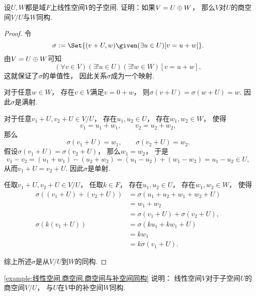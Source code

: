 \begin{example}\label{example:线性空间.商空间.商空间与补空间同构}
设\(U,W\)都是域\(F\)上线性空间\(V\)的子空间.
证明：如果\(V = U \oplus W\)，
那么\(V\)对\(U\)的商空间\(V/U\)与\(W\)同构.
\begin{proof}
令\begin{equation*}
	\sigma \defeq \Set{
		(v+U,w)
		\given
		(\exists u \in U)
		[v=u+w]
	}.
\end{equation*}
由\(V = U \oplus W\)可知\[
	(\forall v \in V)
	(\exists! u \in U)
	(\exists! w\in W)
	[v = u + w],
\]
这就保证了\(\sigma\)的单值性，
因此关系\(\sigma\)成为一个映射.

对于任意\(w \in W\)，
存在\(v \in V\)满足\(v = 0+w\)，
则\(\sigma(v+U) = \sigma(w+U) = w\).
因此\(\sigma\)是满射.

对于任意\(v_1+U,v_2+U \in V/U\)，
存在\(u_1,u_2 \in U\)，
存在\(w_1,w_2 \in W\)，
使得\begin{equation*}
	v_1 = u_1 + w_1,
	\qquad
	v_2 = u_2 + w_2,
\end{equation*}
那么\begin{equation*}
	\sigma(v_1+U) = w_1,
	\qquad
	\sigma(v_2+U) = w_2.
\end{equation*}
假设\(\sigma(v_1+U) = \sigma(v_2+U)\)，
那么\(w_1 = w_2\)，
于是\begin{equation*}
	v_1 - v_2
	= (u_1 + w_1) - (u_2 + w_2)
	= (u_1 - u_2) + (w_1 - w_2)
	= u_1 - u_2
	\in U,
\end{equation*}
从而\(v_1+U = v_2+U\).
因此\(\sigma\)是单射.

任取\(v_1+U,v_2+U \in V/U\)，
任取\(k \in F\)，
存在\(u_1,u_2 \in U\)，
存在\(w_1,w_2 \in W\)，
使得\begin{align*}
	\sigma((v_1+U)+(v_2+U))
	&= \sigma(u_1+u_2+w_1+w_2+U) \\
	&= w_1+w_2 \\
	&= \sigma(v_1+U) + \sigma(v_2+U), \\
	\sigma(k(v_1+U))
	&= \sigma(k u_1+k w_1+U) \\
	&= k w_1 \\
	&= k \sigma(v_1+U).
\end{align*}

综上所述\(\sigma\)是从\(V/U\)到\(W\)的同构.
\end{proof}
\end{example}
\begin{remark}
\cref{example:线性空间.商空间.商空间与补空间同构} 说明：
线性空间\(V\)对于子空间\(U\)的商空间\(V/U\)，
与\(U\)在\(V\)中的补空间\(W\)同构.
\end{remark}

